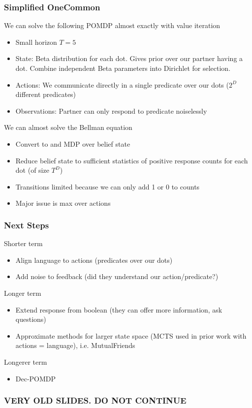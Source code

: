 \documentclass{beamer}
\begin{document}
\begin{frame}
\frametitle{Simplified OneCommon}
We can solve the following POMDP almost exactly with value iteration
\begin{itemize}
\item Small horizon $T=5$
\item State: Beta distribution for each dot.
    Gives prior over our partner having a dot.
    Combine independent Beta parameters into Dirichlet for selection.
\item Actions: We communicate directly in a single predicate over our dots
    ($2^{D}$ different predicates)
\item Observations: Partner can only respond to predicate noiselessly
\end{itemize}
We can almost solve the Bellman equation
\begin{itemize}
\item Convert to and MDP over belief state
\item Reduce belief state to sufficient statistics of positive response counts for each dot
    (of size $T^D$)
\item Transitions limited because we can only add 1 or 0 to counts
\item Major issue is max over actions
\end{itemize}
\end{frame}

\begin{frame}
\frametitle{Next Steps}
Shorter term
\begin{itemize}
\item Align language to actions (predicates over our dots)
\item Add noise to feedback (did they understand our action/predicate?)
\end{itemize}
Longer term
\begin{itemize}
\item Extend response from boolean (they can offer more information, ask questions)
\item Approximate methods for larger state space (MCTS used in prior work with actions = language),
    i.e. MutualFriends
\end{itemize}
Longerer term
\begin{itemize}
\item Dec-POMDP
\end{itemize}
\end{frame}

\begin{frame}
\frametitle{VERY OLD SLIDES. DO NOT CONTINUE}
\end{frame}
\end{document}
